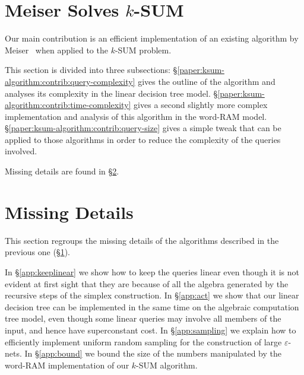 \section{Meiser Solves \texorpdfstring{$k$-SUM}{k-SUM}}%
\label{paper:ksum-algorithm:proofs}

Our main contribution is an efficient implementation of an
existing algorithm by Meiser~\cite{M93} when applied to the \(k\)-SUM problem.

This section is divided into three subsections:
\S\ref{paper:ksum-algorithm:contrib:query-complexity} gives the outline of the
algorithm and analyses its complexity in the linear decision tree model.
\S\ref{paper:ksum-algorithm:contrib:time-complexity} gives a second
slightly more complex implementation and analysis of this algorithm in the word-RAM
model. \S\ref{paper:ksum-algorithm:contrib:query-size} gives a simple
tweak that can be applied to those algorithms in order to reduce the complexity
of the queries involved.

Missing details are found in \S\ref{paper:ksum-algorithm:details}.





\section{Missing Details}\label{paper:ksum-algorithm:details}

This section regroups the missing details of the algorithms described in the
previous one (\S\ref{paper:ksum-algorithm:proofs}).

In \S\ref{app:keeplinear} we show how to keep the queries linear even though it
is not evident at first sight that they are because of all the algebra
generated by the recursive steps of the simplex construction.
%
In \S\ref{app:act} we show that our linear decision tree can be implemented in
the same time on the algebraic computation tree model, even though some linear
queries may involve all members of the input, and hence have superconstant
cost.
%
In \S\ref{app:sampling} we explain how to efficiently implement uniform random sampling
for the construction of large \(\varepsilon\)-nets.
%
In \S\ref{app:bound} we bound the size of the numbers manipulated by the
word-RAM implementation of our \(k\)-SUM algorithm.





